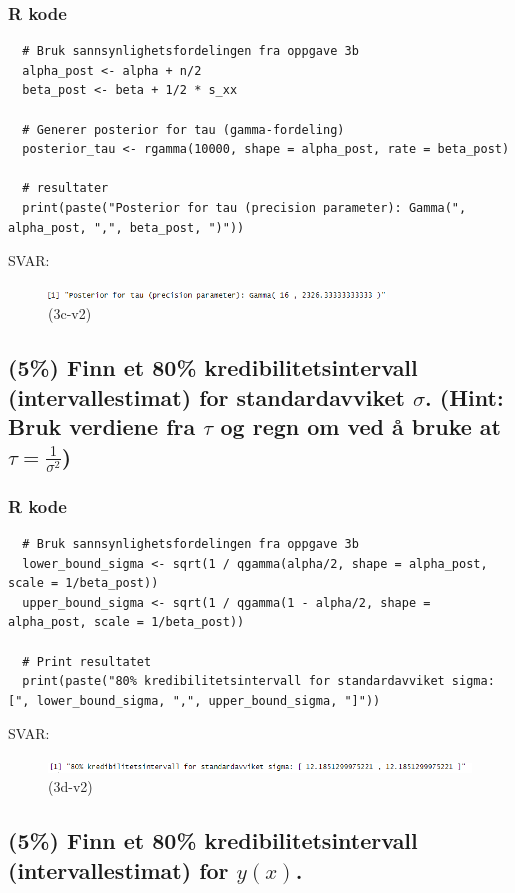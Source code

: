 \documentclass[12pt]{article}
\begin{document}
\subsubsection{R kode}
\begin{verbatim}
  # Bruk sannsynlighetsfordelingen fra oppgave 3b
  alpha_post <- alpha + n/2
  beta_post <- beta + 1/2 * s_xx
  
  # Generer posterior for tau (gamma-fordeling)
  posterior_tau <- rgamma(10000, shape = alpha_post, rate = beta_post)
  
  # resultater
  print(paste("Posterior for tau (precision parameter): Gamma(", alpha_post, ",", beta_post, ")"))
\end{verbatim}
SVAR:
\begin{figure}[H]
  \centering
  \includegraphics[width=0.8\textwidth]{3c-v2.png}
  \caption{(3c-v2)}
\end{figure}



\subsection{(5\%) Finn et 80\% kredibilitetsintervall (intervallestimat) for standardavviket $\sigma$. (Hint: Bruk verdiene fra $\tau$ og regn om ved å bruke at $\tau = \frac{1}{\sigma^2}$)}
\subsubsection{R kode}
\begin{verbatim}
  # Bruk sannsynlighetsfordelingen fra oppgave 3b
  lower_bound_sigma <- sqrt(1 / qgamma(alpha/2, shape = alpha_post, scale = 1/beta_post))
  upper_bound_sigma <- sqrt(1 / qgamma(1 - alpha/2, shape = alpha_post, scale = 1/beta_post))
  
  # Print resultatet
  print(paste("80% kredibilitetsintervall for standardavviket sigma: [", lower_bound_sigma, ",", upper_bound_sigma, "]"))
\end{verbatim}
SVAR:

\begin{figure}[H]
  \centering
  \includegraphics[width=1\textwidth]{3d-v2.png}
  \caption{(3d-v2)}
\end{figure}

\subsection{(5\%) Finn et 80\% kredibilitetsintervall (intervallestimat) for $y(x)$.}
\end{document}
